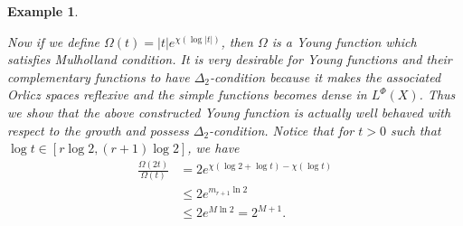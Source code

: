 \documentclass[pdflatex,sn-mathphys-num]{sn-jnl}%
\theoremstyle{thmstyleone}%
\theoremstyle{thmstyletwo}%
\newtheorem{example}{Example}%
\theoremstyle{thmstylethree}%
\begin{document}
\begin{example}
\begin{center}
	\end{center}

		 Now if we define $\Omega(t)=|t|e^{\chi(\log|t|)}$, then $\Omega$ is a Young function which satisfies Mulholland condition. It is very desirable for Young functions and their complementary functions to have $\Delta_2$-condition because it makes the associated Orlicz spaces reflexive and the simple functions becomes dense in $L^\Phi(X)$. Thus we show that the above constructed Young function is actually well behaved with respect to the growth and possess $\Delta_2$-condition.  Notice that for $t>0$ such that $\log t\in [r\log 2,(r+1)\log 2]$, we have
		\begin{align*}
			\frac{\Omega (2t)}{\Omega(t)}&=2e^{\chi(\log 2+\log t)-\chi(\log t)}\\
			&\leq2e^{m_{r+1}\ln 2}\\
			&\leq 2e^{M\ln 2}=2^{M+1}.
		\end{align*}
		

\end{example}
\end{document}
